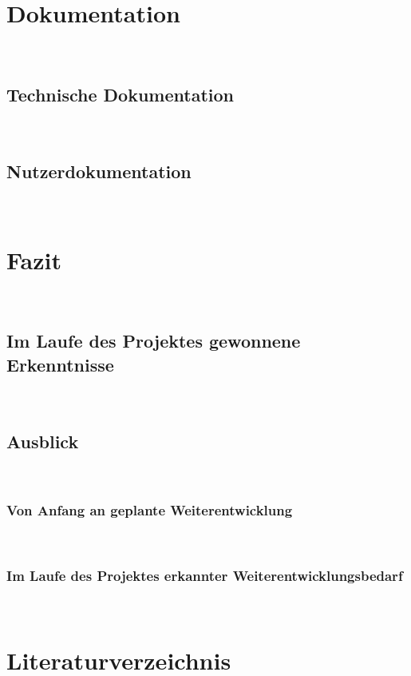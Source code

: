\documentclass[12pt,toc=sectionentrywithoutdots, headheight=44pt, headings=optiontoheadandtoc]{scrartcl}
\begin{document}
\section{Dokumentation}
\blindtext\

\subsection{Technische Dokumentation}
\blindtext\

\subsection{Nutzerdokumentation}
\blindtext\

\section{Fazit}
\blindtext\

\subsection{Im Laufe des Projektes gewonnene Erkenntnisse}
\blindtext\

\subsection{Ausblick}
\blindtext\

\subsubsection{Von Anfang an geplante Weiterentwicklung}
\blindtext\

\subsubsection{Im Laufe des Projektes erkannter Weiterentwicklungsbedarf}
\blindtext\


\newpage
\setcounter{secnumdepth}{0}
\section{Literaturverzeichnis}
\blindtext\label{myLastPage}

\newpage


\setcounter{page}{1}
\setcounter{secnumdepth}{2}
\setcounter{section}{1}
\renewcommand{\thesection}{A}


\ofoot{\thepage}
\end{document}
